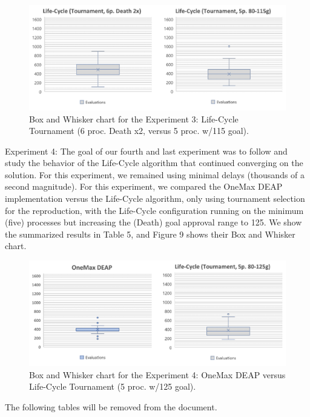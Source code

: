 \documentclass[runningheads]{llncs}
\begin{document}
\begin{figure}
    \includegraphics[width=\textwidth]{img/fig8_experiment03_chart.pdf}
    \caption{Box and Whisker chart for the Experiment 3: Life-Cycle Tournament (6 proc. Death x2, versus 5 proc. w/115 goal).} \label{fig8}
    \end{figure}


Experiment 4: The goal of our fourth and last experiment was to follow and
study the behavior of the Life-Cycle algorithm that continued converging on the
solution. For this experiment, we remained using minimal delays (thousands of a
second magnitude). For this experiment, we compared the OneMax DEAP
implementation versus the Life-Cycle algorithm, only using tournament selection
for the reproduction, with the Life-Cycle configuration running on the minimum
(five) processes but increasing the (Death) goal approval range to 125. We show
the summarized results in Table 5, and Figure 9 shows their Box and Whisker
chart.

\begin{figure}
    \includegraphics[width=\textwidth]{img/fig9_experiment4_chart.pdf}
    \caption{Box and Whisker chart for the Experiment 4: OneMax DEAP versus Life-Cycle Tournament (5 proc. w/125 goal).} \label{fig9}
    \end{figure}



The following tables will be removed from the document.
\end{document}
